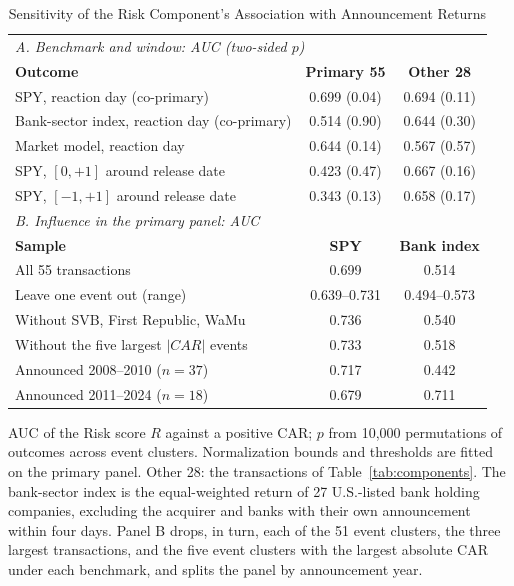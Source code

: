 \begin{table}[!t]
\caption{Sensitivity of the Risk Component's Association with Announcement Returns}
\label{tab:risk}
\centering
\footnotesize
\setlength{\tabcolsep}{3pt}
\begin{tabular}{lcc}
\toprule
\multicolumn{3}{l}{\textit{A. Benchmark and window: AUC (two-sided $p$)}} \\
\textbf{Outcome} & \textbf{Primary 55} & \textbf{Other 28} \\
\midrule
SPY, reaction day (co-primary) & 0.699 (0.04) & 0.694 (0.11) \\
Bank-sector index, reaction day (co-primary) & 0.514 (0.90) & 0.644 (0.30) \\
Market model, reaction day & 0.644 (0.14) & 0.567 (0.57) \\
SPY, $[0,+1]$ around release date & 0.423 (0.47) & 0.667 (0.16) \\
SPY, $[-1,+1]$ around release date & 0.343 (0.13) & 0.658 (0.17) \\
\midrule
\multicolumn{3}{l}{\textit{B. Influence in the primary panel: AUC}} \\
\textbf{Sample} & \textbf{SPY} & \textbf{Bank index} \\
\midrule
All 55 transactions & 0.699 & 0.514 \\
Leave one event out (range) & 0.639--0.731 & 0.494--0.573 \\
Without SVB, First Republic, WaMu & 0.736 & 0.540 \\
Without the five largest $|CAR|$ events & 0.733 & 0.518 \\
Announced 2008--2010 ($n=37$) & 0.717 & 0.442 \\
Announced 2011--2024 ($n=18$) & 0.679 & 0.711 \\
\bottomrule
\end{tabular}
\par\vspace{2pt}\parbox{0.94\columnwidth}{\scriptsize AUC of the Risk score $R$ against a positive CAR; $p$ from 10,000 permutations of
outcomes across event clusters. Normalization bounds and thresholds are fitted on the primary panel. Other 28: the transactions
of Table~\ref{tab:components}. The bank-sector index is the
equal-weighted return of 27 U.S.-listed bank holding companies, excluding the acquirer and banks with their own announcement
within four days. Panel B drops, in turn, each of the 51 event clusters, the three largest transactions, and the five event
clusters with the largest absolute CAR under each benchmark, and splits the panel by announcement year.}
\end{table}
